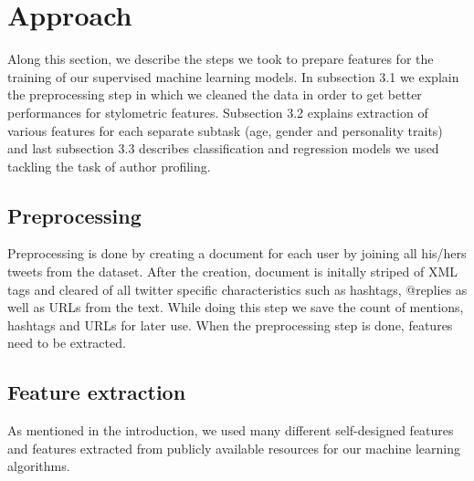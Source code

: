 \documentclass[10pt, a4paper]{article}
\begin{document}
\section{Approach}

Along this section, we describe the steps we took to prepare features for the training of our supervised machine learning models. In subsection 3.1 we explain the preprocessing step in which we cleaned the data in order to get better performances for stylometric features. Subsection 3.2 explains extraction of various features for each separate subtask (age, gender and personality traits) and last subsection 3.3 describes classification and regression models we used tackling the task of author profiling.

\subsection{Preprocessing}

Preprocessing is done by creating a document for each user by joining all his/hers tweets from the dataset. After the creation, document is initally striped of XML tags and cleared of all twitter specific characteristics such as hashtags, @replies as well as URLs from the text. While doing this step we save the count of mentions, hashtags and URLs for later use. When the preprocessing step is done, features need to be extracted. 

\subsection{Feature extraction} 

As mentioned in the introduction, we used many different self-designed features and features extracted from publicly available resources for our machine learning algorithms.
 
\end{document}
